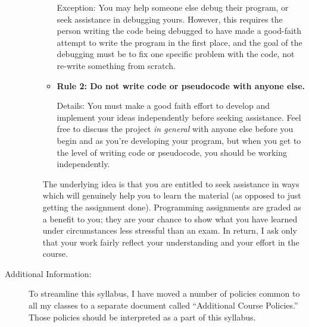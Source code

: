 \documentclass [letterpaper,11pt]{article}
\begin{document}
\begin{description}
\begin{itemize}
\begin{itemize}
                                
                Exception: You may help someone else debug their program, or seek assistance in debugging yours.  However, 
                this requires the person writing the code being debugged to have made a good-faith attempt
                to write the program in the first place, and the goal of the debugging must be to fix
                one specific problem with the code, not re-write something from scratch.
                
                \item \textbf{Rule 2: Do not write code or pseudocode with anyone else.}
                
                Details: You must make a good faith effort to develop and implement your ideas
                independently before seeking assistance.  Feel free to discuss the project \emph{in general} with anyone else
                before you begin and as you're developing your program, but when you get to the level of writing code or
                pseudocode, you should be working independently.
                
                        \end{itemize}
        
        The underlying idea is that you are entitled to seek assistance in ways which will genuinely help you to learn the material (as opposed to just getting the assignment done).  Programming assignments are graded as a benefit to you;  they are your chance to show what you have learned under circumstances less stressful than an exam.  In return, I ask only that your work fairly reflect your understanding and your effort in the course.
        \end{itemize}

\item[Additional Information:] To streamline this syllabus, I have moved a number of policies
common to all my classes to a separate document called ``Additional Course Policies.'' 
Those policies should be interpreted as a part of this syllabus.



\end{description}
\end{document}
